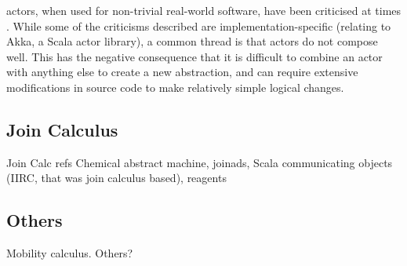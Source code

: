 \Glspl{actor}, when used for non-trivial real-world software, have been criticised at times \cite{Welsh2013,Stucchio2013}.  While some of the criticisms described are implementation-specific (relating to Akka, a Scala \gls{actor} library), a common thread is that \glspl{actor} do not compose well.  This has the negative consequence that it is difficult to combine an \gls{actor} with anything else to create a new abstraction, and can require extensive modifications in source code to make relatively simple logical changes.

\subsection{Join Calculus}

\begin{anfxwarning}{Join Calc refs}
Chemical abstract machine, joinads, Scala communicating objects (IIRC, that was join calculus based), reagents
\end{anfxwarning}

\subsection{Others}
Mobility calculus.  Others?


